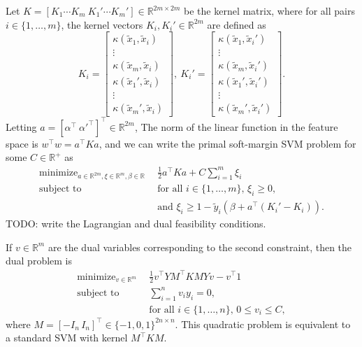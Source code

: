 \documentclass{article}
\newcommand{\RR}{\mathbb R}
\DeclareMathOperator*{\minimize}{minimize}
\begin{document}
Let $K=[K_1\cdots K_m\ K_1'\cdots K_m']\in\RR^{2m\times 2m}$ be the
kernel matrix, where for all pairs $i\in\{1, \dots, m\}$, the kernel
vectors $K_i,K_i'\in\RR^{2m}$ are defined as
\begin{equation}
  K_i = \left[
    \begin{array}{c}
      \kappa(\tilde x_1, \tilde x_i)\\
      \vdots\\
      \kappa(\tilde x_m, \tilde x_i)\\
      \kappa(\tilde x_1', \tilde x_i)\\
      \vdots\\
      \kappa(\tilde x_m', \tilde x_i)
    \end{array}
  \right],\ 
  K_i' = \left[
    \begin{array}{c}
      \kappa(\tilde x_1, \tilde x_i')\\
      \vdots\\
      \kappa(\tilde x_m, \tilde x_i')\\
      \kappa(\tilde x_1', \tilde x_i')\\
      \vdots\\
      \kappa(\tilde x_m', \tilde x_i')
    \end{array}
  \right].
\end{equation}
Letting $a=[\alpha^\intercal\
\alpha'^\intercal]^\intercal\in\RR^{2m}$, The norm of the linear
function in the feature space is $w^\intercal w = a^\intercal K a$,
and we can write the primal soft-margin SVM problem for some
$C\in\RR^+$ as
\begin{equation}
  \begin{aligned}
      \minimize_{a\in\RR^{2m},\xi\in\RR^m,\beta\in\RR}\ \ & 
      \frac 1 2 a^\intercal K a + C\sum_{i=1}^m \xi_i \\
      \text{subject to}\ \ & 
      \text{for all $i\in\{1,\dots,m\}$, }
      \xi_i \geq 0,\\
      &\text{and }
      \xi_i \geq 1-\tilde y_i(\beta + a^\intercal (K_i'-K_i)).
  \end{aligned}
\end{equation}
TODO: write the Lagrangian and dual feasibility conditions.

If $v\in\RR^m$ are the dual variables corresponding to the second
constraint, then the dual problem is
\begin{equation}
  \begin{aligned}
    \label{eq:svm-dual}
    \minimize_{v\in\RR^m}\ \ &
    \frac 1 2 v^\intercal Y M^\intercal K M Y v - v^\intercal 1\\
    \text{subject to}\ \ &
    \sum_{i=1}^n v_i y_i = 0,\\
&    \text{for all $i\in\{1,\dots,n\}$, } 0\leq v_i\leq C,
  \end{aligned}
\end{equation}
where $M=[-I_n \, I_n]^\intercal\in\{-1,0,1\}^{2n\times n}$. This quadratic problem
is equivalent to a standard SVM with kernel $M^\intercal K M$.
\end{document}
